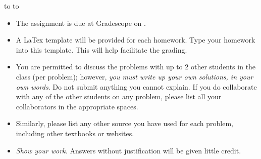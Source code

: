 \documentclass[10pt]{article}
\newcommand{\1}{\vec{\mathbbm{1}}}
\newcommand{\handout}{
   \renewcommand{\thepage}{H\hnumber-\arabic{page}}
   \noindent
   \begin{center}
      \vbox{
    \hbox to \columnwidth {\sc{\course} --- \prof \hfill}
    \vspace{-2mm}
    \hbox to \columnwidth {\sc due \MakeLowercase{\duedate} \duelocation\hfill {\Huge\color{mdb}H\hnumber.\yourname}}
      }
   \end{center}
   \vspace*{2mm}
}
\begin{document}
\handout
\begin{itemize}

\item The assignment is due at Gradescope on \duedate.

\item A LaTex template will be provided for each homework. Type your homework into this template. This will help facilitate the grading.

\item You are permitted to discuss the problems with up to 2 other students in the class (per problem); however, {\em you must write up your own solutions, in your own words}. Do not submit anything you cannot explain. If you do collaborate with any of the other students on any problem, please list all your collaborators in the appropriate spaces.

\item Similarly, please list any other source you have used for each problem, including other textbooks or websites.

\item {\em Show your work.} Answers without justification will be given little credit.

\end{itemize}


\newpage
\end{document}
